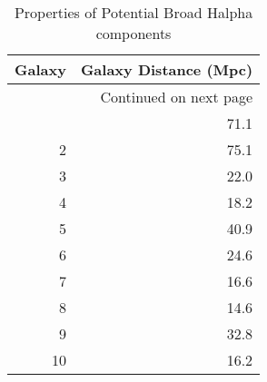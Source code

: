 \begin{longtable}{rr}
\caption{Properties of Potential Broad Halpha components}\\
\toprule
 Galaxy &  Galaxy Distance (Mpc) \\
\midrule
\endhead
\midrule
\multicolumn{2}{r}{{Continued on next page}} \\
\midrule
\endfoot

\bottomrule
\endlastfoot
      1 &                   71.1 \\
      2 &                   75.1 \\
      3 &                   22.0 \\
      4 &                   18.2 \\
      5 &                   40.9 \\
      6 &                   24.6 \\
      7 &                   16.6 \\
      8 &                   14.6 \\
      9 &                   32.8 \\
     10 &                   16.2 \\
\end{longtable}
